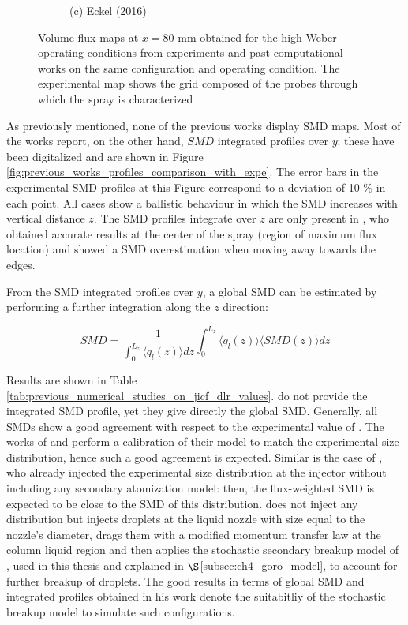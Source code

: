 \begin{figure}[h!]
\begin{subfigure}[b]{0.2\textwidth}
   \caption*{(c) Eckel (2016)}
\end{subfigure}
\caption{Volume flux maps at $x = 80$ mm obtained for the high Weber operating conditions from experiments  and past computational works on the same configuration and operating condition. The experimental map shows the grid composed of the probes through which the spray is characterized}
\label{fig:maps_previous_numerical_results}
\end{figure}

As previously mentioned, none of the previous works display SMD maps. Most of the works report, on the other hand, $SMD$ integrated profiles over $y$: these have been digitalized and are shown in Figure \ref{fig:previous_works_profiles_comparison_with_expe}.   The error bars in the experimental SMD profiles at this Figure correspond to a deviation of 10 $\%$ in each point. All cases show a ballistic behaviour in which the SMD increases with vertical distance $z$. The SMD profiles integrate over $z$ are only present in , who obtained accurate results at the center of the spray (region of maximum flux location) and showed a SMD overestimation when moving away towards the edges.

From the SMD integrated profiles over $y$, a global SMD can be estimated by performing a further integration along the $z$ direction:

\begin{equation}
 SMD =  \frac{1}{ \int_0^{L_z} \langle q_l \left( z \right) \rangle dz} \int_0^{L_z} \langle q_l \left( z \right) \rangle \langle SMD \left( z \right) \rangle dz
\end{equation}


Results are shown in Table \ref{tab:previous_numerical_studies_on_jicf_dlr_values}.   do not provide the integrated SMD profile, yet they give directly the global SMD. Generally, all SMDs show a good agreement with respect to the experimental value of . The works of  and  perform a calibration of their model to match the experimental size distribution, hence such a good agreement is expected. Similar is the case of , who already injected the experimental size distribution at the injector without including any secondary atomization model: then, the flux-weighted SMD is expected to be close to the SMD of this distribution.  does not inject any distribution but injects droplets at the liquid nozzle with size equal to the nozzle's diameter, drags them with a modified momentum transfer law at the column liquid region and then applies the stochastic secondary breakup model of , used in this thesis and explained in $\S$\ref{subsec:ch4_goro_model}, to account for further breakup of droplets. The good results in terms of global SMD and integrated profiles obtained in his work denote the suitabitliy of the stochastic breakup model to simulate such configurations.



